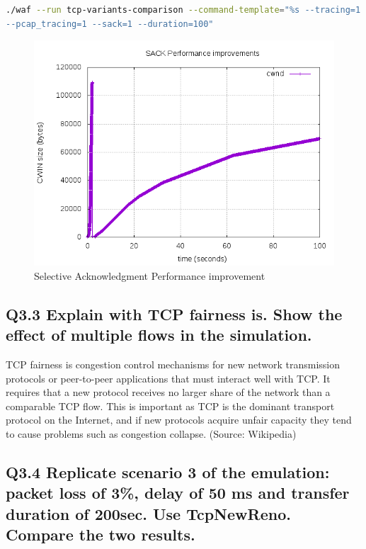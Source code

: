 \documentclass{article}
\begin{document}
\begin{lstlisting}[language=bash]
./waf --run tcp-variants-comparison --command-template="%s --tracing=1 
--pcap_tracing=1 --sack=1 --duration=100"
\end{lstlisting}

\begin{figure}[H]
\centering
\includegraphics[width=12cm]{figures/SackTCPVariantsComparison.png}
\caption{Selective Acknowledgment Performance improvement}
\end{figure}




\subsection{Q3.3 Explain with TCP fairness is. Show the effect of
multiple flows in the simulation.}


TCP fairness is congestion control mechanisms for new network transmission protocols or peer-to-peer applications that must interact well with TCP. It requires that a new protocol receives no larger share of the network than a comparable TCP flow. This is important as TCP is the dominant transport protocol on the Internet, and if new protocols acquire unfair capacity they tend to cause problems such as congestion collapse. (Source: Wikipedia) 




\subsection{Q3.4 Replicate scenario 3 of the emulation: packet loss of
3\%, delay of 50 ms and transfer duration of 200sec. Use TcpNewReno.
Compare the two results.}
\end{document}
